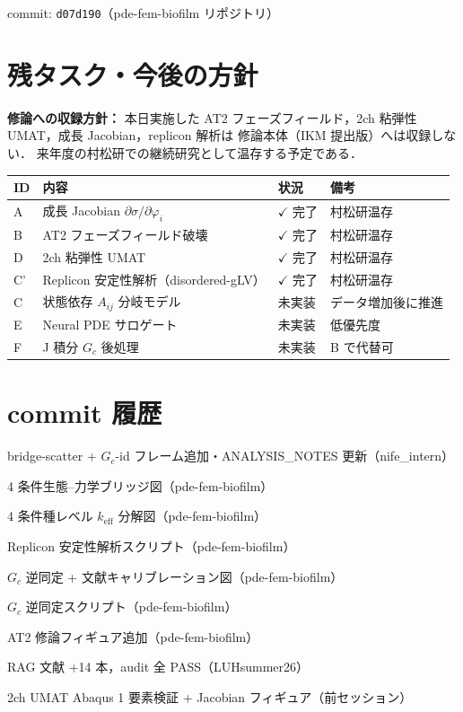 \documentclass[12pt, a4paper]{article}
\begin{document}
commit: \texttt{d07d190}（pde-fem-biofilm リポジトリ）

\section{残タスク・今後の方針}

\textbf{修論への収録方針：}
本日実施した AT2 フェーズフィールド，2ch 粘弾性 UMAT，成長 Jacobian，replicon 解析は
修論本体（IKM 提出版）へは収録しない．
来年度の村松研での継続研究として温存する予定である．

\medskip
\begin{center}
\small
\begin{tabular}{llll}
\toprule
ID & 内容 & 状況 & 備考 \\
\midrule
A & 成長 Jacobian $\partial\sigma/\partial\varphi_i$ & $\checkmark$ 完了 & 村松研温存 \\
B & AT2 フェーズフィールド破壊 & $\checkmark$ 完了 & 村松研温存 \\
D & 2ch 粘弾性 UMAT & $\checkmark$ 完了 & 村松研温存 \\
C' & Replicon 安定性解析（disordered-gLV） & $\checkmark$ 完了 & 村松研温存 \\
C & 状態依存 $A_{ij}$ 分岐モデル & 未実装 & データ増加後に推進 \\
E & Neural PDE サロゲート & 未実装 & 低優先度 \\
F & J 積分 $G_c$ 後処理 & 未実装 & B で代替可 \\
\bottomrule
\end{tabular}
\end{center}

\section*{commit 履歴}
\begin{description}[leftmargin=6em, labelwidth=5em]
  \item[\texttt{d67ea88}] bridge-scatter + $G_c$-id フレーム追加・ANALYSIS\_NOTES 更新（nife\_intern）
  \item[\texttt{d07d190}] 4 条件生態–力学ブリッジ図（pde-fem-biofilm）
  \item[\texttt{e99ea57}] 4 条件種レベル $k_\mathrm{eff}$ 分解図（pde-fem-biofilm）
  \item[\texttt{df4bfdc}] Replicon 安定性解析スクリプト（pde-fem-biofilm）
  \item[\texttt{746360e}] $G_c$ 逆同定 + 文献キャリブレーション図（pde-fem-biofilm）
  \item[\texttt{79db654}] $G_c$ 逆同定スクリプト（pde-fem-biofilm）
  \item[\texttt{a33c830}] AT2 修論フィギュア追加（pde-fem-biofilm）
  \item[\texttt{34e078d}] RAG 文献 +14 本，audit 全 PASS（LUHsummer26）
  \item[\texttt{1fc57e5}] 2ch UMAT Abaqus 1 要素検証 + Jacobian フィギュア（前セッション）
\end{description}
\end{document}
